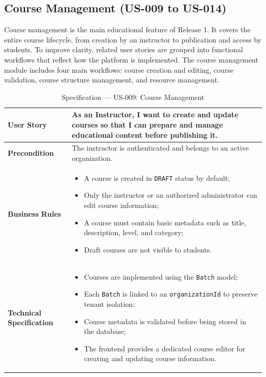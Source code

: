 \subsection{Course Management (US-009 to US-014)}
Course management is the main educational feature of Release 1. It covers the entire course lifecycle, from creation by an instructor to publication and access by students. To improve clarity, related user stories are grouped into functional workflows that reflect how the platform is implemented. The course management module includes four main workflows: course creation and editing, course validation, course structure management, and resource management.

\begin{table}[H]
\centering
\caption{Specification — US-009: Course Management}
\label{tab:us009}
\renewcommand{\arraystretch}{1}
\begin{tabularx}{\textwidth}{|p{2.5cm}|X|}
\hline
\textbf{User Story} & As an Instructor, I want to create and update courses so that I can prepare and manage educational content before publishing it. \\
\hline
\textbf{Precondition} & The instructor is authenticated and belongs to an active organization. \\
\hline
\textbf{Business Rules} &
\begin{itemize}
  \item A course is created in \texttt{DRAFT} status by default;
  \item Only the instructor or an authorized administrator can edit course information;
  \item A course must contain basic metadata such as title, description, level, and category;
  \item Draft courses are not visible to students.
\end{itemize} \\
\hline
\textbf{Technical Specification} &
\begin{itemize}
  \item Courses are implemented using the \texttt{Batch} model;
  \item Each \texttt{Batch} is linked to an \texttt{organizationId} to preserve tenant isolation;
  \item Course metadata is validated before being stored in the database;
  \item The frontend provides a dedicated course editor for creating and updating course information.
\end{itemize} \\

\end{tabularx}
\end{table}
